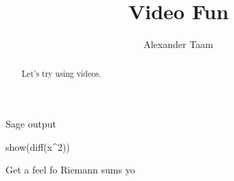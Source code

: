 \documentclass{ximera}
\title{Video Fun}
\author{Alexander Taam}
\begin{document}
\begin{abstract}
  Let's try using videos.
\end{abstract}
\maketitle

Sage output

	\begin{sageOutput}
	show(diff(x^2))
	\end{sageOutput}


Get a feel fo Riemann sums yo

\end{document}
